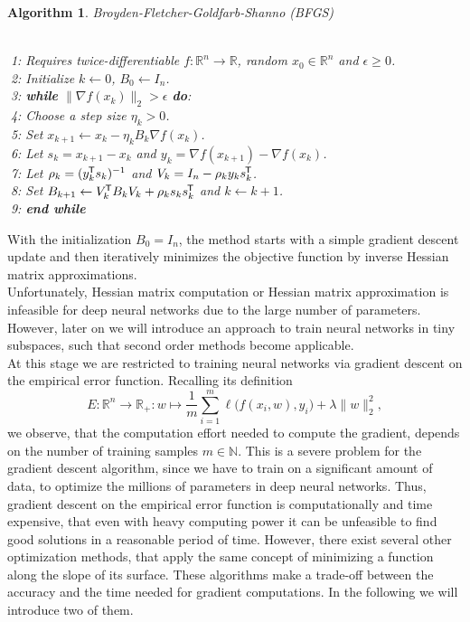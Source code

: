 \documentclass[11pt, a4paper]{article}
\newtheorem{algorithm}[theorem]{Algorithm}
\newcommand{\N}{\mathbb{N}}
\newcommand{\R}{\mathbb{R}}
\newcommand*{\tr}{^{\mkern-1.5mu\mathsf{T}}}
\begin{document}
\begin{algorithm}
\caption{Broyden-Fletcher-Goldfarb-Shanno (BFGS)} \ \\
\textcolor{white}{$\Big |$}1: Requires twice-differentiable $f: \R^n \to \R$, random $x_0 \in \R^n$ and  $\epsilon \geq 0$. \\
\textcolor{white}{$\Big |$}2: Initialize $k \leftarrow 0$, $B_0 \leftarrow I_n$. \\
\textcolor{white}{$\Big |$}3: \textbf{while} $ \big \| \nabla f(x_k) \big \|_2 > \epsilon $ \textbf{do}: \\
\textcolor{white}{$\Big |$}4: \quad Choose a step size $\eta_k > 0$. \\
\textcolor{white}{$\Big |$}5: \quad Set $x_{k+1} \leftarrow x_k - \eta_k B_k \nabla f(x_{k})$. \\
\textcolor{white}{$\Big |$}6: \quad Let $s_k = x_{k+1} - x_{k}$ and $y_k = \nabla f(x_{k+1}) - \nabla f(x_{k})$. \\
\textcolor{white}{$\Big |$}7: \quad Let $\rho_k = (y_k\tr s_k)^{-1}$ and $V_k = I_n - \rho_k y_k s_k\tr $. \\
\textcolor{white}{$\Big |$}8: \quad Set $B_{k+1} \leftarrow V_k\tr B_{k}V_k + \rho_k s_k s_k\tr $ and $k \leftarrow k+1$. \\
\textcolor{white}{$\Big |$}9: \textbf{end while}
\end{algorithm}

With the initialization $B_0 = I_n$, the method starts with a simple gradient descent update and then iteratively minimizes the objective function by inverse Hessian matrix approximations. \\

Unfortunately, Hessian matrix computation or Hessian matrix approximation is infeasible for deep neural networks due to the large number of parameters. However, later on we will introduce an approach to train neural networks in tiny subspaces, such that second order methods become applicable. \\

At this stage we are restricted to training neural networks via gradient descent on the empirical error function. Recalling its definition
 \[ E : \R^n \to \R_+ : w \mapsto \frac{1}{m} \sum_{i=1}^{m} \ell \big ( f(x_i,w),y_i \big) + \lambda \big \| w \big \|_2^2, \]
we observe, that the computation effort needed to compute the gradient, depends on the number of training samples $m \in \N$. This is a severe problem for the gradient descent algorithm, since we have to train on a significant amount of data, to optimize the millions of parameters in deep neural networks. Thus, gradient descent on the empirical error function is computationally and time expensive, that even with heavy computing power it can be unfeasible to find good solutions in a reasonable period of time. However, there exist several other optimization methods, that apply the same concept of minimizing a function along the slope of its surface. These algorithms make a trade-off between the accuracy and the time needed for gradient computations. In the following we will introduce two of them. \\
\end{document}

